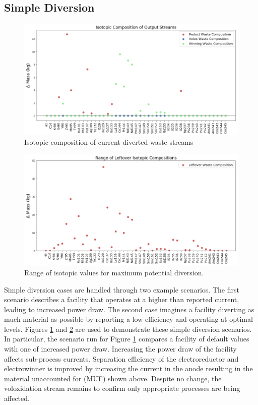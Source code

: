 \subsection{Simple Diversion}
\begin{figure} [h]
	\includegraphics[width=\linewidth]{images/current-isotope-comp}
	\caption{Isotopic composition of current diverted waste streams}
	\label{fig:current-isotope-comp}
\end{figure}

\begin{figure} [h]
	\includegraphics[width=\linewidth]{images/isotopic-comp-range}
	\caption{Range of isotopic values for maximum potential diversion.}
	\label{fig:isotopic-range}
\end{figure}

Simple diversion cases are handled through two example scenarios. The first scenario describes a facility that operates at a higher than reported current, leading to increased power draw. The second case imagines a facility diverting as much material as possible by reporting a low efficiency and operating at optimal levels.
Figures \ref{fig:current-isotope-comp} and \ref{fig:isotopic-range} are used to demonstrate these simple diversion scenarios. In particular, the scenario run for Figure
\ref{fig:current-isotope-comp} compares a facility of default values with one of increased power draw. Increasing the power draw of the facility affects sub-process currents.
Separation efficiency of the electroreductor and electrowinner is improved by increasing the current in the anode resulting in the material unaccounted for (MUF) shown above. Despite no change, the voloxidation stream
remains to confirm only appropriate processes are being affected. 

